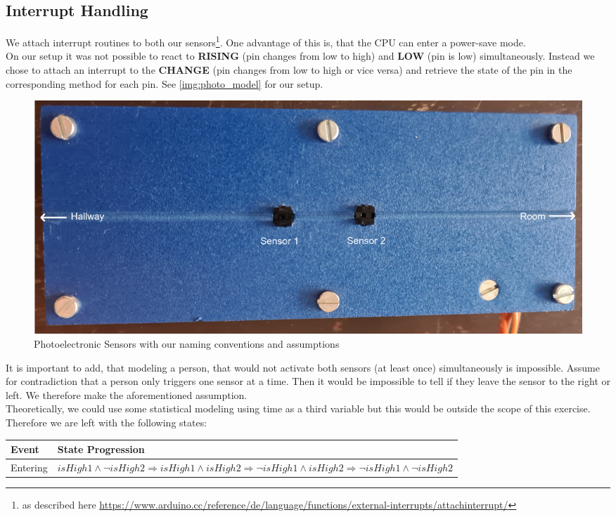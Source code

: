 \documentclass[]{article}
\begin{document}
\begin{sloppypar}
\subsection{Interrupt Handling}
We attach interrupt routines to both our sensors\footnote{as described here \url{https://www.arduino.cc/reference/de/language/functions/external-interrupts/attachinterrupt/}}. One advantage of this is, that the CPU can enter a power-save mode.\\
On our setup it was not possible to react to \textbf{RISING} (pin changes from low to high) and \textbf{LOW} (pin is low) simultaneously. Instead we chose to attach an interrupt to the \textbf{CHANGE} (pin changes from low to high or vice versa) and retrieve the state of the pin in the corresponding method for each pin. See \eqref{img:photo_model} for our setup.\\
\begin{figure}[p]
	\centering
	\includegraphics[width=\textwidth, keepaspectratio]{./images/photoelectric_model.png}
	\caption{Photoelectronic Sensors with our naming conventions and assumptions}\label{img:photo_model}
\end{figure}
It is important to add, that modeling a person, that would not activate both sensors (at least once) simultaneously is impossible. Assume for contradiction that a person only triggers one sensor at a time. Then it would be impossible to tell if they leave the sensor to the right or left. We therefore make the aforementioned assumption.\\
Theoretically, we could use some statistical modeling using time as a third variable but this would be outside the scope of this exercise.
Therefore we are left with the following states:
\begin{table}[H]
	\centering
\begin{tabularx}{.9\textwidth}{| l | X |}
			\hline
			Event & State Progression \\
			\hline
			Entering & $\mathit{isHigh1} \wedge \neg \mathit{isHigh2} \Longrightarrow \mathit{isHigh1} \wedge \mathit{isHigh2} \Longrightarrow \neg \mathit{isHigh1} \wedge \mathit{isHigh2} \Longrightarrow \neg \mathit{isHigh1} \wedge \neg \mathit{isHigh2}$\\

\end{tabularx}
\end{table}
\end{sloppypar}
\end{document}
